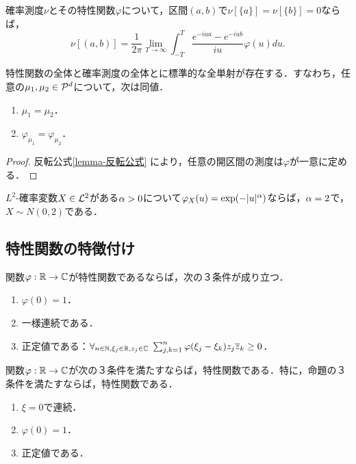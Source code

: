 \documentclass[uplatex,dvipdfmx]{jsreport}
\begin{document}
\begin{lemma}\label{lemma-反転公式}
    確率測度$\nu$とその特性関数$\varphi$について，区間$(a,b)$で$\nu[\{a\}]=\nu[\{b\}]=0$ならば，
    \[\nu[(a,b)]=\frac{1}{2\pi}\lim_{T\to\infty}\int^T_{-T}\frac{e^{-iua}-e^{-iub}}{iu}\varphi(u)du.\]
\end{lemma}

\begin{theorem}[一意性定理]
    特性関数の全体と確率測度の全体とに標準的な全単射が存在する．すなわち，任意の$\mu_1,\mu_2\in\P^d$について，次は同値．
    \begin{enumerate}
        \item $\mu_1=\mu_2$．
        \item $\varphi_{\mu_1}=\varphi_{\mu_2}$．
    \end{enumerate}
\end{theorem}
\begin{proof}
    反転公式\ref{lemma-反転公式}
    により，任意の開区間の測度は$\varphi$が一意に定める．
\end{proof}

\begin{corollary}
    $L^2$-確率変数$X\in\L^2$がある$\al>0$について$\varphi_X(u)=\exp(-\abs{u}^\al)$ならば，$\al=2$で，$X\sim N(0,2)$である．
\end{corollary}

\subsection{特性関数の特徴付け}

\begin{proposition}
    関数$\varphi:\R\to\C$が特性関数であるならば，次の３条件が成り立つ．
    \begin{enumerate}
        \item $\varphi(0)=1$．
        \item 一様連続である．
        \item 正定値である：$\forall_{n\in\N,\xi_j\in\R,z_j\in\C}\;\sum^n_{j,k=1}\varphi(\xi_j-\xi_k)z_j\o{z}_k\ge0$．
    \end{enumerate}
\end{proposition}

\begin{theorem}[Bochner]\label{thm-Bochner}
    関数$\varphi:\R\to\C$が次の３条件を満たすならば，特性関数である．特に，命題の３条件を満たすならば，特性関数である．
    \begin{enumerate}
        \item $\xi=0$で連続．
        \item $\varphi(0)=1$．
        \item 正定値である．
    \end{enumerate}
\end{theorem}
\end{document}
